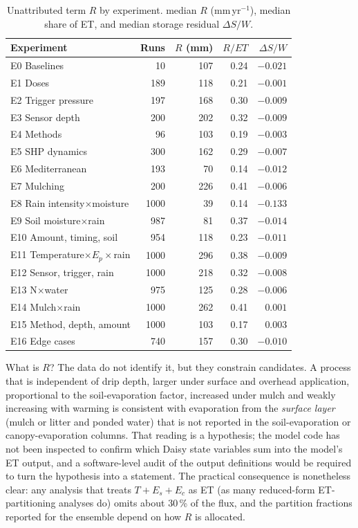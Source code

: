 \begin{table}[H]\centering\small
\caption{Unattributed term $R$ by experiment. median $R$ (mm\,yr$^{-1}$), median share of ET, and median storage residual $\Delta S/W$.}
\label{tab:R}
\begin{tabular}{lrrrr}
\toprule
Experiment & Runs & $R$ (mm) & $R/\mathit{ET}$ & $\Delta S/W$\\\midrule
E0 Baselines & 10 & 107 & 0.24 & $-0.021$\\
E1 Doses & 189 & 118 & 0.21 & $-0.001$\\
E2 Trigger pressure & 197 & 168 & 0.30 & $-0.009$\\
E3 Sensor depth & 200 & 202 & 0.32 & $-0.009$\\
E4 Methods & 96 & 103 & 0.19 & $-0.003$\\
E5 SHP dynamics & 300 & 162 & 0.29 & $-0.007$\\
E6 Mediterranean & 193 & 70 & 0.14 & $-0.012$\\
E7 Mulching & 200 & 226 & 0.41 & $-0.006$\\
E8 Rain intensity$\times$moisture & 1000 & 39 & 0.14 & $-0.133$\\
E9 Soil moisture$\times$rain & 987 & 81 & 0.37 & $-0.014$\\
E10 Amount, timing, soil & 954 & 118 & 0.23 & $-0.011$\\
E11 Temperature$\times E_p\times$rain & 1000 & 296 & 0.38 & $-0.009$\\
E12 Sensor, trigger, rain & 1000 & 218 & 0.32 & $-0.008$\\
E13 N$\times$water & 975 & 125 & 0.28 & $-0.006$\\
E14 Mulch$\times$rain & 1000 & 262 & 0.41 & $0.001$\\
E15 Method, depth, amount & 1000 & 103 & 0.17 & $0.003$\\
E16 Edge cases & 740 & 157 & 0.30 & $-0.010$\\\bottomrule
\end{tabular}
\end{table}

What is $R$? The data do not identify it, but they constrain candidates. A process that is independent of drip depth, larger under surface and overhead application, proportional to the soil-evaporation factor, increased under mulch and weakly increasing with warming is consistent with evaporation from the \emph{surface layer} (mulch or litter and ponded water) that is not reported in the soil-evaporation or canopy-evaporation columns. That reading is a hypothesis; the model code has not been inspected to confirm which Daisy state variables sum into the model's ET output, and a software-level audit of the output definitions would be required to turn the hypothesis into a statement. The practical consequence is nonetheless clear: any analysis that treats $T+E_s+E_c$ as ET (as many reduced-form ET-partitioning analyses do) omits about 30\,\% of the flux, and the partition fractions reported for the ensemble depend on how $R$ is allocated.

